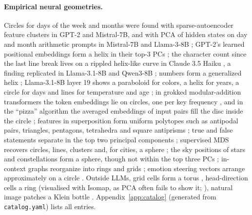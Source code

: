 \documentclass[10pt]{article}
\begin{document}
\paragraph{Empirical neural geometries.} Circles for days of the week and months were found with sparse-autoencoder feature clusters in GPT-2 and Mistral-7B, and with PCA of hidden states on day and month arithmetic prompts in Mistral-7B and Llama-3-8B \citep{engels2025notall}; GPT-2's learned positional embeddings form a helix in their top-3 PCs \citep{yedidia2023helix}; the character count since the last line break lives on a rippled helix-like curve in Claude 3.5 Haiku \citep{gurnee2025linebreaks}, a finding replicated in Llama-3.1-8B and Qwen3-8B \citep{sinii2026counting}; numbers form a generalized helix \citep{kantamneni2025trig}; Llama-3.1-8B layer 19 shows a paraboloid for colors, a helix for years, a circle for days and lines for temperature and age \citep{bhalla2026sae}; in grokked modular-addition transformers the token embeddings lie on circles, one per key frequency \citep{nanda2023progress,zhong2023clock}, and in the ``pizza'' algorithm the averaged embeddings of input pairs fill the disc inside the circle \citep{zhong2023clock}; features in superposition form uniform polytopes such as antipodal pairs, triangles, pentagons, tetrahedra and square antiprisms \citep{elhage2022tms}; true and false statements separate in the top two principal components \citep{marks2024truth}; supervised MDS recovers circles, lines, clusters and, for cities, a sphere \citep{tiblias2025smds}; the sky positions of stars and constellations form a sphere, though not within the top three PCs \citep{berdnikov2026sky}; in-context graphs reorganize into rings and grids \citep{park2025iclr}; emotion steering vectors arrange approximately on a circle \citep{sun2026valence}. Outside LLMs, grid cells form a torus \citep{gardner2022torus}, head-direction cells a ring (visualised with Isomap, as PCA often fails to show it; \citealp{chaudhuri2019ring}), natural image patches a Klein bottle \citep{carlsson2008klein}. Appendix~\ref{app:catalog} (generated from \texttt{catalog.yaml}) lists all entries.
\end{document}
